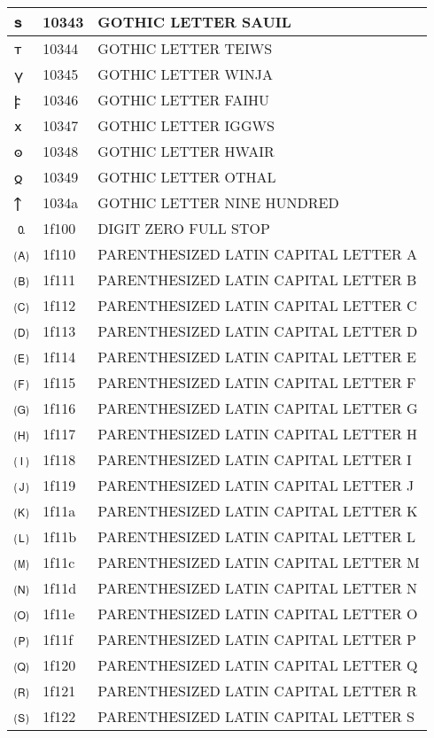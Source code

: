 \documentclass[12pt,letterpaper,openany]{book}
\begin{document}
\begin{center}
\begin{supertabular}{|m{0.25in}|m{0.5in}|m{4in}|}
			𐍃 & 10343 & GOTHIC LETTER SAUIL\\\hline
			𐍄 & 10344 & GOTHIC LETTER TEIWS\\\hline
			𐍅 & 10345 & GOTHIC LETTER WINJA\\\hline
			𐍆 & 10346 & GOTHIC LETTER FAIHU\\\hline
			𐍇 & 10347 & GOTHIC LETTER IGGWS\\\hline
			𐍈 & 10348 & GOTHIC LETTER HWAIR\\\hline
			𐍉 & 10349 & GOTHIC LETTER OTHAL\\\hline
			𐍊 & 1034a & GOTHIC LETTER NINE HUNDRED\\\hline
			🄀 & 1f100 & DIGIT ZERO FULL STOP\\\hline
			🄐 & 1f110 & PARENTHESIZED LATIN CAPITAL LETTER A\\\hline
			🄑 & 1f111 & PARENTHESIZED LATIN CAPITAL LETTER B\\\hline
			🄒 & 1f112 & PARENTHESIZED LATIN CAPITAL LETTER C\\\hline
			🄓 & 1f113 & PARENTHESIZED LATIN CAPITAL LETTER D\\\hline
			🄔 & 1f114 & PARENTHESIZED LATIN CAPITAL LETTER E\\\hline
			🄕 & 1f115 & PARENTHESIZED LATIN CAPITAL LETTER F\\\hline
			🄖 & 1f116 & PARENTHESIZED LATIN CAPITAL LETTER G\\\hline
			🄗 & 1f117 & PARENTHESIZED LATIN CAPITAL LETTER H\\\hline
			🄘 & 1f118 & PARENTHESIZED LATIN CAPITAL LETTER I\\\hline
			🄙 & 1f119 & PARENTHESIZED LATIN CAPITAL LETTER J\\\hline
			🄚 & 1f11a & PARENTHESIZED LATIN CAPITAL LETTER K\\\hline
			🄛 & 1f11b & PARENTHESIZED LATIN CAPITAL LETTER L\\\hline
			🄜 & 1f11c & PARENTHESIZED LATIN CAPITAL LETTER M\\\hline
			🄝 & 1f11d & PARENTHESIZED LATIN CAPITAL LETTER N\\\hline
			🄞 & 1f11e & PARENTHESIZED LATIN CAPITAL LETTER O\\\hline
			🄟 & 1f11f & PARENTHESIZED LATIN CAPITAL LETTER P\\\hline
			🄠 & 1f120 & PARENTHESIZED LATIN CAPITAL LETTER Q\\\hline
			🄡 & 1f121 & PARENTHESIZED LATIN CAPITAL LETTER R\\\hline
			🄢 & 1f122 & PARENTHESIZED LATIN CAPITAL LETTER S\\\hline

\end{supertabular}
\end{center}
\end{document}
